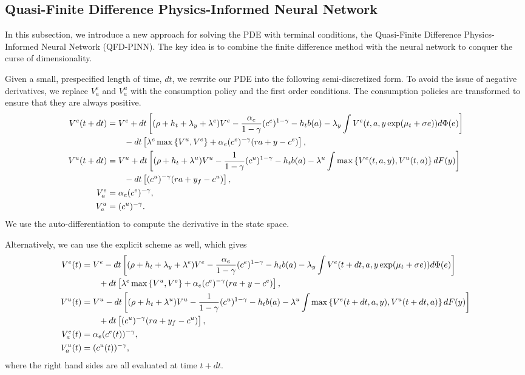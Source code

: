 \documentclass[a4paper, 12pt]{article}
\begin{document}
\subsection{Quasi-Finite Difference Physics-Informed Neural Network}
In this subsection, we introduce a new approach for solving the PDE with terminal 
conditions, the Quasi-Finite Difference Physics-Informed Neural Network (QFD-PINN). 
The key idea is to combine the finite difference method with the neural network to 
conquer the curse of dimensionality. 

Given a small, prespecified length of time, $dt$, we rewrite our PDE into the following 
semi-discretized form. To avoid the issue of negative derivatives, we replace $V^e_a$ 
and $V^u_a$ with the consumption policy and the first order conditions. The 
consumption policies are transformed to ensure that they are always positive. 
\begin{align}
    V^e(t+dt) &= V^e + dt\sbrc{(\rho + h_t + \lambda_y + \lambda^e)V^e - \frac{\alpha_e}{1-\gamma}(c^e)^{1 - \gamma} - h_tb(a) - \lambda_y\int V^e(t,a,y\exp(\mu_t + \sigma e))d\Phi(e)} \nonumber \\
    &\qquad - dt\sbrc{\lambda^e\max\set{V^u, V^e} + \alpha_e(c^e)^{-\gamma}\pth{ra + y - c^e}}, \label{eq:implicit_qfd_e}\\
    V^u(t+dt) &= V^u + dt\sbrc{(\rho + h_t + \lambda^u)V^u - \frac{1}{1-\gamma}(c^u)^{1 - \gamma} - h_tb(a) - \lambda^u\int \max\set{V^e(t,a,y), V^u(t,a)}dF(y)} \nonumber \\
    &\qquad - dt\sbrc{(c^u)^{-\gamma}\pth{ra + y_f - c^u}}, \label{eq:implicit_qfd_u} \\
    V_a^e &= \alpha_e (c^e)^{-\gamma}, \label{eq:implicit_foc_e} \\ 
    V_a^u &= (c^u)^{-\gamma}. \label{eq:implicit_foc_u} 
\end{align}
We use the auto-differentiation to compute the derivative in the state space. 

Alternatively, we can use the explicit scheme as well, which gives 
\begin{align}
    V^e(t) &= V^e - dt\sbrc{(\rho + h_t + \lambda_y + \lambda^e)V^e - \frac{\alpha_e}{1-\gamma}(c^e)^{1 - \gamma} - h_tb(a) - \lambda_y\int V^e(t+dt,a,y\exp(\mu_t + \sigma e))d\Phi(e)} \nonumber \\
    &\qquad + dt\sbrc{\lambda^e\max\set{V^u, V^e} + \alpha_e(c^e)^{-\gamma}\pth{ra + y - c^e}}, \label{eq:explicit_qfd_e}\\
    V^u(t) &= V^u - dt\sbrc{(\rho + h_t + \lambda^u)V^u - \frac{1}{1-\gamma}(c^u)^{1 - \gamma} - h_tb(a) - \lambda^u\int \max\set{V^e(t+dt,a,y), V^u(t+dt,a)}dF(y)} \nonumber \\
    &\qquad + dt\sbrc{(c^u)^{-\gamma}\pth{ra + y_f - c^u}}, \label{eq:explicit_qfd_u} \\
    V_a^e(t) &= \alpha_e (c^e(t))^{-\gamma}, \label{eq:explicit_foc_e} \\ 
    V_a^u(t) &= (c^u(t))^{-\gamma}, \label{eq:explicit_foc_u} 
\end{align}
where the right hand sides are all evaluated at time $t+dt$.
\end{document}
